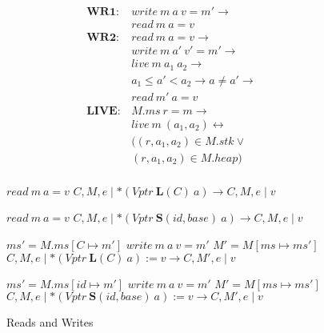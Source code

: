 \documentclass{article}
\begin{document}
\begin{figure}

  \begin{minipage}[t]{0.3\textwidth}
    \[\begin{aligned}
    \mathbf{WR1} : & \mathit{write} ~ m ~ a ~ v = m' \rightarrow & \\
    & \mathit{read} ~ m ~ a = v & \\[0.75em]
    \mathbf{WR2} : & \mathit{read} ~ m ~ a = v \rightarrow & \\
    & \mathit{write} ~ m ~ a' ~ v' = m' \rightarrow & \\
    & \mathit{live} ~ m ~ a_1 ~ a_2 \rightarrow & \\
    & a_1 \leq a' < a_2 \rightarrow a \not = a' \rightarrow & \\
    & \mathit{read} ~ m' ~ a = v & \\[0.75em]
    \mathbf{LIVE} : & M.ms ~ r = m \rightarrow & \\
    & \mathit{live} ~ m ~ (a_1,a_2) \leftrightarrow & \\
    & ((r,a_1,a_2) \in M.stk \lor & \\
    & (r,a_1,a_2) \in M.heap) & \\
    \end{aligned}\]
  \end{minipage}
  \begin{minipage}[t]{0.69\textwidth}
                {\(\mathit{read} ~ m ~ a = v\)}
                {\(C,M,e \mid *(\mathit{Vptr} ~ \mathbf{L}(C) ~ a)
                  \longrightarrow C,M,e \mid v\)}

                {\(\mathit{read} ~ m ~ a = v\)}
                {\(C,M,e \mid *(\mathit{Vptr} ~ \mathbf{S}(id, \mathit{base}) ~ a)
                  \longrightarrow C,M,e \mid v\)}

                  {\(ms' = M.ms[C\mapsto m']\)}
                  {\(\mathit{write} ~ m ~ a ~ v = m'\)}
                  {\(M' = M[ms \mapsto ms']\)}
                  {\(C,M,e \mid *(\mathit{Vptr} ~ \mathbf{L}(C) ~ a) := v
                    \longrightarrow C,M',e \mid v\)}

                  {\(ms' = M.ms[id \mapsto m']\)}
                  {\(\mathit{write} ~ m ~ a ~ v = m'\)}
                  {\(M' = M[ms \mapsto ms']\)}
                  {\(C,M,e \mid *(\mathit{Vptr} ~ \mathbf{S}(id, \mathit{base}) ~ a) := v
                    \longrightarrow C,M',e \mid v\)}
  \end{minipage}

  \caption{Reads and Writes}
  \label{subfig:rwstep}
\end{figure}
\end{document}
